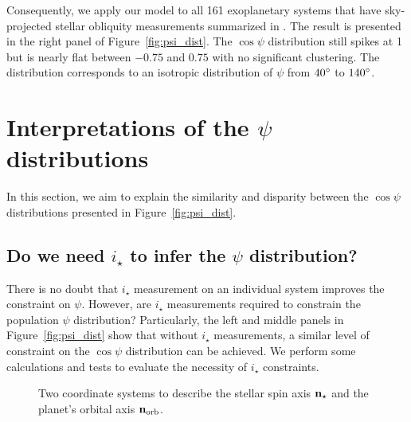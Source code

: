 \documentclass[twocolumn,times]{aastex631}
\newcommand{\numall}{161\xspace}
\begin{document}
Consequently, we apply our model to all \numall exoplanetary systems that have sky-projected stellar obliquity measurements summarized in \cite{Albrecht22}. The result is presented in the right panel of Figure~\ref{fig:psi_dist}. The $\cos{\psi}$ distribution still spikes at 1 but is nearly flat between $-0.75$ and $0.75$ with no significant clustering. The distribution corresponds to an isotropic distribution of $\psi$ from $40\mbox{$^\circ$}$ to $140\mbox{$^\circ$}$.

\section{Interpretations of the \texorpdfstring{$\psi$}{psi} distributions}\label{sec:interpretations}

In this section, we aim to explain the similarity and disparity between the $\cos{\psi}$ distributions presented in Figure~\ref{fig:psi_dist}.

\subsection{Do we need \texorpdfstring{$i_\star$}{istar} to infer the \texorpdfstring{$\psi$}{psi} distribution?}

There is no doubt that $i_\star$ measurement on an individual system improves the constraint on $\psi$. However, are $i_\star$ measurements required to constrain the population $\psi$ distribution? Particularly, the left and middle panels in Figure~\ref{fig:psi_dist} show that without $i_\star$ measurements, a similar level of constraint on the $\cos{\psi}$ distribution can be achieved. We perform some calculations and tests to evaluate the necessity of $i_\star$ constraints.

\begin{figure*}[ht!]
    \vspace*{-1.5cm}
    \caption{Two coordinate systems to describe the stellar spin axis $\bf{n}_{\star}$ and the planet's orbital axis $\bf{n}_{\rm orb}$.}
    \label{fig:coord}
\end{figure*}
\end{document}
